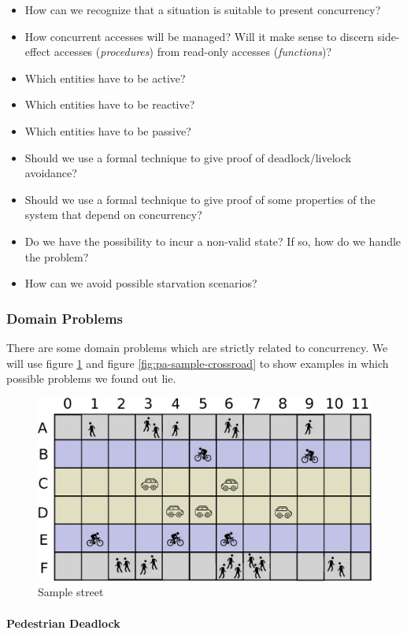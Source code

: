 \begin{itemize}
\item How can we recognize that a situation is suitable to present concurrency?
\item How concurrent accesses will be managed? Will it make sense to discern
  side-effect accesses (\emph{procedures}) from read-only accesses
  (\emph{functions})?
\item Which entities have to be active?
\item Which entities have to be reactive?
\item Which entities have to be passive?
\item Should we use a formal technique to give proof of deadlock/livelock
  avoidance?
\item Should we use a formal technique to give proof of some properties of the
  system that depend on concurrency?
\item Do we have the possibility to incur a non-valid state? If so, how do we
  handle the problem?
\item How can we avoid possible starvation scenarios?
\end{itemize}

\subsubsection{Domain Problems}

There are some domain problems which are strictly related to concurrency.
We will use figure \ref{fig:pa-sample-street} and figure
\ref{fig:pa-sample-crossroad} to show examples in which possible problems we
found out lie.

\begin{figure}[H]
  \centering
  \includegraphics[width=.7\columnwidth]{sections/images/analysis/street_base.eps}
  \caption{Sample street}
  \label{fig:pa-sample-street}
\end{figure}

\paragraph{Pedestrian Deadlock} \mbox{} \\

